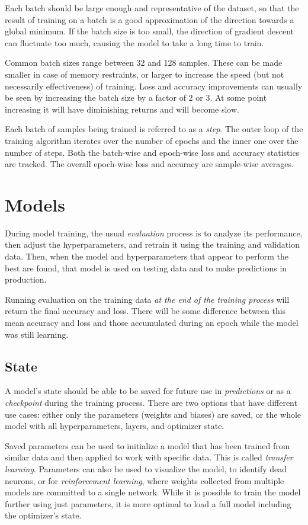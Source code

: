 \documentclass[a4paper]{report}
\begin{document}
Each batch should be large enough and representative of the dataset, so that the result of training on a batch is a good approximation of the direction towards a global minimum. If the batch size is too small, the direction of gradient descent can fluctuate too much, causing the model to take a long time to train. 

Common batch sizes range between 32 and 128 samples. These can be made smaller in case of memory restraints, or larger to increase the speed (but not necessarily effectiveness) of training. Loss and accuracy improvements can usually be seen by increasing the batch size by a factor of 2 or 3. At some point increasing it will have diminishing returns and will become slow. 

Each batch of samples being trained is referred to as a \emph{step}. The outer loop of the training algorithm iterates over the number of epochs and the inner one over the number of steps. Both the batch-wise and epoch-wise loss and accuracy statistics are tracked. The overall epoch-wise loss and accuracy are sample-wise averages.

\section{Models}
During model training, the usual \emph{evaluation} process is to analyze its performance, then adjust the hyperparameters, and retrain it using the training and validation data. Then, when the model and hyperparameters that appear to perform the best are found, that model is used on testing data and to make predictions in production. 

Running evaluation on the training data \textit{at the end of the training process} will return the final accuracy and loss. There will be some difference between this mean accuracy and loss and those accumulated during an epoch while the model was still learning.

\subsection*{State}
A model's state should be able to be saved for future use in \emph{predictions} or as a \emph{checkpoint} during the training process. There are two options that have different use cases: either only the parameters (weights and biases) are saved, or the whole model with all hyperparameters, layers, and optimizer state. 

Saved parameters can be used to initialize a model that has been trained from similar data and then applied to work with specific data. This is called \emph{transfer learning}. Parameters can also be used to visualize the model, to identify dead neurons, or for \emph{reinforcement learning}, where weights collected from multiple models are committed to a single network. While it is possible to train the model further using just parameters, it is more optimal to load a full model including the optimizer's state.
\end{document}
